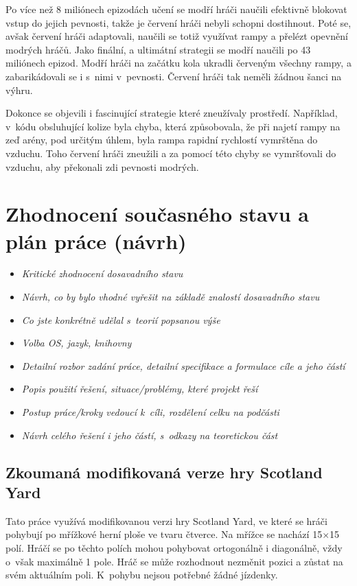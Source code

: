 Po více než 8 miliónech epizodách učení se modří hráči naučili efektivně blokovat vstup do jejich pevnosti, takže je červení hráči nebyli schopni dostihnout.
Poté se, avšak červení hráči adaptovali, naučili se totiž využívat rampy a přelézt opevnění modrých hráčů.
Jako finální, a ultimátní strategii se modří naučili po 43 miliónech epizod.
Modří hráči na začátku kola ukradli červeným všechny rampy, a zabarikádovali se i s~nimi v~pevnosti.
Červení hráči tak neměli žádnou šanci na výhru.

Dokonce se objevili i fascinující strategie které zneužívaly prostředí.
Například, v~kódu obsluhující kolize byla chyba, která způsobovala, že při najetí rampy na zeď arény, pod určitým úhlem, byla rampa rapidní rychlostí vymrštěna do vzduchu.
Toho červení hráči zneužili a za pomocí této chyby se vymršťovali do vzduchu, aby překonali zdi pevnosti modrých.

\chapter{Zhodnocení současného stavu a plán práce (návrh)}
\label{ch:navrh}
\begin{itemize}
  \item \emph {Kritické zhodnocení dosavadního stavu}
  \item \emph {Návrh, co by bylo vhodné vyřešit na základě znalostí dosavadního stavu}
  \item \emph {Co jste konkrétně udělal s~teorií popsanou výše}
  \item \emph {Volba OS, jazyk, knihovny}
  \item \emph {Detailní rozbor zadání práce, detailní specifikace a formulace cíle a jeho částí}
  \item \emph {Popis použití řešení, situace/problémy, které projekt řeší}
  \item \emph {Postup práce/kroky vedoucí k~cíli, rozdělení celku na podčásti}
  \item \emph {Návrh celého řešení i jeho částí, s~odkazy na teoretickou část}
\end{itemize}

\section{Zkoumaná modifikovaná verze hry Scotland Yard}\label{sec:zkoumana-modifikovana-verze-hry-scotland-yard}

Tato práce využívá modifikovanou verzi hry Scotland Yard, ve které se hráči pohybují po mřížkové herní ploše ve tvaru čtverce.
Na mřížce se nachází 15$\times$15 polí.
Hráčí se po těchto polích mohou pohybovat ortogonálně i diagonálně, vždy o~však maximálně 1 pole.
Hráč se může rozhodnout nezměnit pozici a zůstat na svém aktuálním poli.
K~pohybu nejsou potřebné žádné jízdenky.

